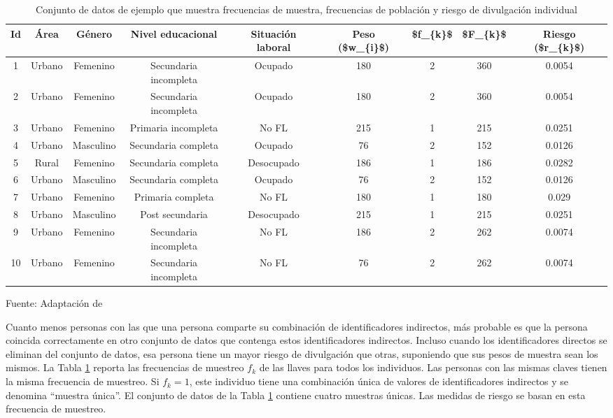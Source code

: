 \documentclass[]{book}
\theoremstyle{definition}
\theoremstyle{definition}
\theoremstyle{definition}
\theoremstyle{definition}
\theoremstyle{remark}
\begin{document}
\begin{table}

\caption{\label{tab:tabMR1}Conjunto de datos de ejemplo que muestra frecuencias de muestra, frecuencias de población y riesgo de divulgación individual}
\centering
\begin{tabular}[t]{c|c|c|c|c|c|c|c|c}
\hline
Id & Área & Género & Nivel educacional & Situación laboral & Peso (\$w\_\{i\}\$) & \$f\_\{k\}\$ & \$F\_\{k\}\$  & Riesgo (\$r\_\{k\}\$)\\
\hline
1 & Urbano & Femenino & Secundaria incompleta & Ocupado & 180 & 2 & 360 & 0.0054\\
\hline
2 & Urbano & Femenino & Secundaria incompleta & Ocupado & 180 & 2 & 360 & 0.0054\\
\hline
3 & Urbano & Femenino & Primaria incompleta & No FL & 215 & 1 & 215 & 0.0251\\
\hline
4 & Urbano & Masculino & Secundaria completa & Ocupado & 76 & 2 & 152 & 0.0126\\
\hline
5 & Rural & Femenino & Secundaria completa & Desocupado & 186 & 1 & 186 & 0.0282\\
\hline
6 & Urbano & Masculino & Secundaria completa & Ocupado & 76 & 2 & 152 & 0.0126\\
\hline
7 & Urbano & Femenino & Primaria completa & No FL & 180 & 1 & 180 & 0.029\\
\hline
8 & Urbano & Masculino & Post secundaria & Desocupado & 215 & 1 & 215 & 0.0251\\
\hline
9 & Urbano & Femenino & Secundaria incompleta & No FL & 186 & 2 & 262 & 0.0074\\
\hline
10 & Urbano & Femenino & Secundaria incompleta & No FL & 76 & 2 & 262 & 0.0074\\
\hline
\end{tabular}
\end{table}

Fuente: Adaptación de \citep[p.28]{benschop}

Cuanto menos personas con las que una persona comparte su combinación de identificadores indirectos, más probable es que la persona coincida correctamente en otro conjunto de datos que contenga estos identificadores indirectos. Incluso cuando los identificadores directos se eliminan del conjunto de datos, esa persona tiene un mayor riesgo de divulgación que otras, suponiendo que sus pesos de muestra sean los mismos. La Tabla \ref{tab:tabMR1} reporta las frecuencias de muestreo \(f_{k}\) de las llaves para todos los individuos. Las personas con las mismas claves tienen la misma frecuencia de muestreo. Si \(f_{k}=1\), este individuo tiene una combinación única de valores de identificadores indirectos y se denomina ``muestra única''. El conjunto de datos de la Tabla \ref{tab:tabMR1} contiene cuatro muestras únicas. Las medidas de riesgo se basan en esta frecuencia de muestreo.
\end{document}
